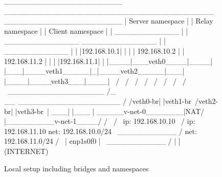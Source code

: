 \vspace{0.5cm}
\begin{figure}[H]
\centering
\begin{myverbatim}
 ______________________         _______________________________________        ______________________
|   Server namespace   |       |            Relay namespace            |      |   Client namespace   |
|     ____________     |       |    ______________   ______________    |      |     ____________     |
|    |192.168.10.1|    |       |   | 192.168.10.2 | | 192.168.11.2 |   |      |    |192.168.11.1|    |
|____|___veth0____|____|       |___|____veth1_____|_|____veth2_____|___|      |____|____veth3___|____|
            \                            /                 \                             /
             \                          /                   \                           /
              \                        /                     \                         /
               \                      /                       \                       /
                \ __________________ /_                      __\ ___________________ /
                /veth0-br|     |veth1-br\                   /veth2-br|      |veth3-br\
                |                    ___|                   |___                     |
                \_____v-net-0_______|NAT/                   \NAT|_________v-net-1____/
                        /              \                     /                \
               ip: 192.168.10.10        \                   /         ip: 192.168.11.10
               net: 192.168.10.0/24      \   ___________   /          net: 192.168.11.0/24
                                           /             \
                                          |   enp1s0f0    |
                                           \ ___________ /
                                                  |
                                                  |
                                              (INTERNET)

\end{myverbatim}
\caption{Local setup including bridges and namespaces}\label{fig:namespace-setup}
\end{figure}
\vspace{0.5cm}

